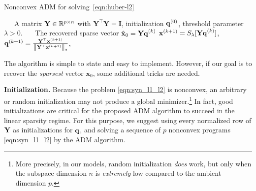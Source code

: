 \documentclass[11pt, journal, final]{IEEEtran}
\numberwithin{equation}{section}
\newcommand{\mb}{\mathbf}
\newcommand{\norm}[1]{\left\lVert#1\right\rVert}
\newcommand{ \paren }[1]{ \left( #1 \right) }
\begin{document}
{\begin{algorithm}
\caption{Nonconvex ADM for solving~\eqref{eqn:huber-l2}}
\label{ADM}
\begin{algorithmic}[1]
\renewcommand{\algorithmicrequire}{\textbf{Input:}}
\renewcommand{\algorithmicensure}{\textbf{Output:}}
\REQUIRE~~\
A matrix ${\bf Y}\in\mathbb{R}^{p\times n}$ with $\mb Y^\top \mb Y = \mb I$, initialization ${\bf q}^{(0)}$, threshold parameter $\lambda > 0$.
\ENSURE~~\
The recovered sparse vector $\hat{\bf x}_0= {\bf Yq}^{(k)}$
\FOR{$k = 0, \dots, O\paren{n^4 \log n}$}
\STATE ${\bf x}^{(k+1)} = S_{\lambda}[{\bf Yq}^{(k)}]$,
\STATE ${\bf q}^{(k+1)} = \frac{{\bf Y}^\top{\bf x}^{(k+1)}}{\norm{{\bf Y}^\top{\bf x}^{(k+1)}}_2}$,
\ENDFOR
\end{algorithmic}
\end{algorithm}

The algorithm is simple to state and easy to implement. However, if our goal is to recover the {\em sparsest} vector $\mb x_0$, some additional tricks are needed.
\par\smallskip

\noindent\textbf{Initialization.} Because the problem \eqref{eqn:syn_l1_l2} is nonconvex, an arbitrary or random initialization may not produce a global minimizer.\footnote{More precisely, in our models, random initialization {\em does} work, but only when the subspace dimension $n$ is \emph{extremely} low compared to the ambient dimension $p$.} In fact, good initializations are critical for the proposed ADM algorithm to succeed in the linear sparsity regime. For this purpose, we suggest using every normalized row of ${\bf Y}$ as initializations for ${\bf q}$, and solving a sequence of $p$ nonconvex programs \eqref{eqn:syn_l1_l2} by the ADM algorithm.

}
\end{document}
